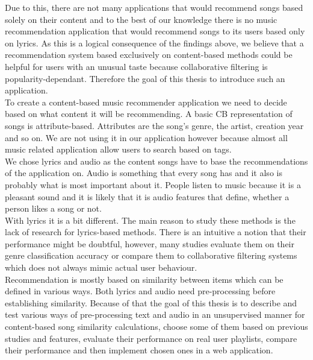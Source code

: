 Due to this, there are not many applications that would recommend songs based solely on their content and to the best of our knowledge there is no music recommendation application that would recommend songs to its users based only on lyrics. As this is a logical consequence of the findings above, we believe that a recommendation system based exclusively on content-based methods could be helpful for users with an unusual taste because collaborative filtering is popularity-dependant. Therefore the goal of this thesis to introduce such an application. \\
To create a content-based music recommender application we need to decide based on what content it will be recommending. A basic CB representation of songs is attribute-based. Attributes are the song's genre, the artist, creation year and so on. We are not using it in our application however because almost all music related application allow users to search based on tags. \\
We chose lyrics and audio as the content songs have to base the recommendations of the application on. Audio is something that every song has and it also is probably what is most important about it. People listen to music because it is a pleasant sound and it is likely that it is audio features that define, whether a person likes a song or not. \\
With lyrics it is a bit different. The main reason to study these methods is the lack of research for lyrics-based methods. There is an intuitive a notion that their performance might be doubtful, however, many studies evaluate them on their genre classification accuracy \cite{DBLP:journals/corr/Tsaptsinos17} or compare them to collaborative filtering systems \cite{Gossi2016LyricBasedMR} which does not always mimic actual user behaviour. \\
Recommendation is mostly based on similarity between items which can be defined in various ways. Both lyrics and audio need pre-processing before establishing similarity.  Because of that the goal of this thesis is to describe and test various ways of pre-processing text and audio in an unsupervised manner for content-based song similarity calculations, choose some of them based on previous studies and features, evaluate their performance on real user playlists, compare their performance and then implement chosen ones in a web application.\\


